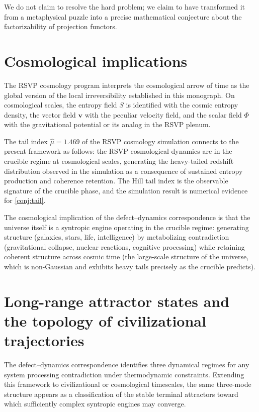 \documentclass[12pt, oneside]{memoir}
\newcommand{\bv}{\mathbf{v}}
\begin{document}
We do not claim to resolve the hard problem; we claim to have transformed it from a
metaphysical puzzle into a precise mathematical conjecture about the factorizability of
projection functors.

\section{Cosmological implications}

The RSVP cosmology program interprets the cosmological arrow of time
as the global version of the local irreversibility established in this monograph.  On
cosmological scales, the entropy field $S$ is identified with the cosmic entropy density,
the vector field $\bv$ with the peculiar velocity field, and the scalar field $\Phi$
with the gravitational potential or its analog in the RSVP plenum.

The tail index $\hat\mu = 1.469$ of the RSVP cosmology simulation connects to the
present framework as follows: the RSVP cosmological dynamics are in the crucible regime
at cosmological scales, generating the heavy-tailed redshift distribution observed in the
simulation as a consequence of sustained entropy production and coherence retention.  The
Hill tail index is the observable signature of the crucible phase, and the simulation
result is numerical evidence for \cref{conj:tail}.

The cosmological implication of the defect--dynamics correspondence is that the universe
itself is a syntropic engine operating in the crucible regime: generating structure
(galaxies, stars, life, intelligence) by metabolizing contradiction (gravitational
collapse, nuclear reactions, cognitive processing) while retaining coherent structure
across cosmic time (the large-scale structure of the universe, which is non-Gaussian and
exhibits heavy tails precisely as the crucible predicts).

\section{Long-range attractor states and the topology of civilizational trajectories}
\label{sec:attractors-civ}

The defect--dynamics correspondence identifies three dynamical regimes for any system
processing contradiction under thermodynamic constraints.  Extending this framework to
civilizational or cosmological timescales, the same three-mode structure appears as a
classification of the stable terminal attractors toward which sufficiently complex
syntropic engines may converge.
\end{document}
